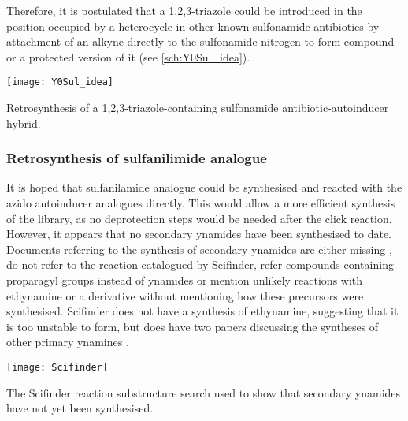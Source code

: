 Therefore, it is postulated that a 1,2,3-triazole could be introduced in the position occupied by a heterocycle in other known sulfonamide antibiotics by attachment of an alkyne directly to the sulfonamide nitrogen to form compound  or a protected version of it (see \ref{sch:Y0Sul_idea}).

\begin{scheme}[H]
	\begin{center}
		\texttt{[image: Y0Sul\_idea]}
		\caption{Retrosynthesis of a 1,2,3-triazole-containing sulfonamide antibiotic-autoinducer hybrid.
		\label{sch:Y0Sul_idea}}
	\end{center}
\end{scheme}

\subsubsection{Retrosynthesis of sulfanilimide analogue }

It is hoped that sulfanilamide analogue  could be synthesised and reacted with the azido autoinducer analogues directly. This would allow a more efficient synthesis of the library, as no deprotection steps would be needed after the click reaction. However, it appears that no secondary ynamides have been synthesised to date\cite{ScifinderSecondaryYnamide}.
Documents referring to the synthesis of secondary ynamides are either missing \cite{Vellanki2013}, do not refer to the reaction catalogued by Scifinder\cite{Yamaguchi2013,Kaiser2010,Zavyalov1967}, refer compounds containing proparagyl groups instead of ynamides\cite{Gnaccarini2012,Wang2012,Rajopadhye2007,LeitDeMoradeiMarcela2006} or mention unlikely reactions with ethynamine\cite{Edmondson2013} or a derivative\cite{Fujimaki1999} without mentioning how these precursors were synthesised. Scifinder does not have a synthesis of ethynamine, suggesting that it is too unstable to form, but does have two papers discussing the syntheses of other primary ynamines \cite{Shvartsberg1976,Hill1998}.

\begin{scheme}[H]
	\begin{center}
		\texttt{[image: Scifinder]}
		\caption{The Scifinder reaction substructure search used to show that secondary ynamides have not yet been synthesised\cite{ScifinderSecondaryYnamide}.
		\label{fig:Scifinder}}
	\end{center}
\end{scheme}

